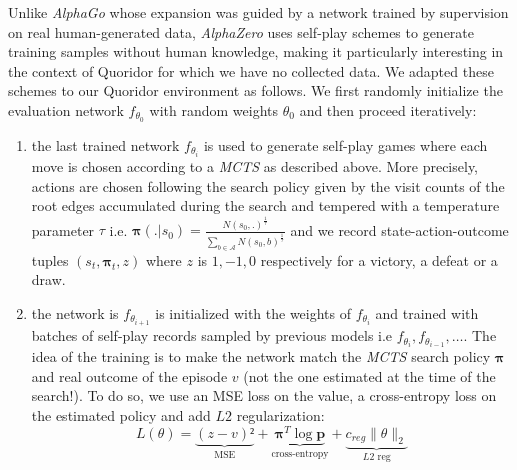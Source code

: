 \documentclass[journal, a4paper]{IEEEtran}
\begin{document}
    Unlike \textit{AlphaGo}\cite{alphago} whose expansion was guided by a network trained by supervision on real human-generated data, \textit{AlphaZero} uses self-play schemes to generate training samples without human knowledge, making it particularly interesting in the context of Quoridor for which we have no collected data. We adapted these schemes to our Quoridor environment as follows. We first randomly initialize the evaluation network $f_{\theta_0}$ with random weights $\theta_0$ and then proceed iteratively:
    \begin{enumerate}
        \item the last trained network $f_{\theta_i}$ is used to generate self-play games where each move is chosen according to a \textit{MCTS} as described above. More precisely, actions are chosen following the search policy given by the visit counts of the root edges accumulated during the search and tempered with a temperature parameter $\tau$ i.e. $\boldsymbol{\pi}(.|s_0)=\frac{N(s_0,.)^\frac{1}{\tau}}{\sum_{b\in\mathcal{A}}N(s_0, b)^\frac{1}{\tau}}$ and we record state-action-outcome tuples $(s_t, \boldsymbol{\pi}_t, z)$ where $z$ is $1, -1, 0$ respectively for a victory, a defeat or a draw.
        \item the network is $f_{\theta_{i+1}}$ is initialized with the weights of $f_{\theta_i}$ and trained with batches of self-play records sampled by previous models i.e $f_{\theta_i}, f_{\theta_{i-1}}, \ldots$. The idea of the training is to make the network match the \textit{MCTS} search policy $\boldsymbol{\pi}$ and real outcome of the episode $v$ (not the one estimated at the time of the search!). To do so, we use an MSE loss on the value, a cross-entropy loss on the estimated policy and add $L2$ regularization:
        \begin{equation}
            L(\theta) = \underbrace{(z-v)²}_\text{MSE}+\underbrace{\boldsymbol{\pi}^T\log\mathbf{p}}_\text{cross-entropy}+\underbrace{c_{reg}\lVert\theta\rVert_2}_{L2\text{ reg}}
        \end{equation}
    \end{enumerate} 
\end{document}
